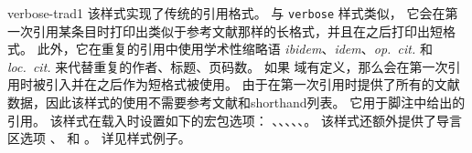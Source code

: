 \begin{marglist}
\item[verbose-trad1]
该样式实现了传统的引用格式。
与 \texttt{verbose} 样式类似，
它会在第一次引用某条目时打印出类似于参考文献那样的长格式，并且在之后打印出短格式。
此外，它在重复的引用中使用学术性缩略语 \emph{ibidem}、\emph{idem}、\emph{op.~cit.} 和 \emph{loc.~cit.} 来代替重复的作者、标题、页码数。
如果  域有定义，那么会在第一次引用时被引入并在之后作为短格式被使用。
由于在第一次引用时提供了所有的文献数据，因此该样式的使用不需要参考文献和shorthand列表。
它用于脚注中给出的引用。
该样式在载入时设置如下的宏包选项：
、、、、、。
该样式还额外提供了导言区选项 、 和 。
详见样式例子。


\end{marglist}
